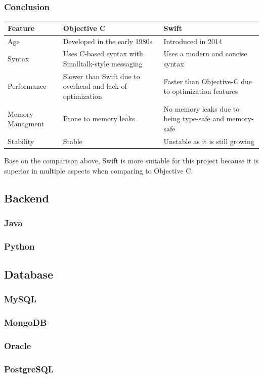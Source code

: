 \subsubsection{Conclusion}

\begin{table}[H]
    \centering
    \begin{tabular}{| >{\centering\arraybackslash}m{2cm} | >{\centering\arraybackslash}m{6cm} | >{\centering\arraybackslash}m{6cm} |}
        \hline
        \textbf{Feature} & \textbf{Objective C} & \textbf{Swift} \\ \hline
        Age & Developed in the early 1980s & Introduced in 2014 \\ \hline
        Syntax & Uses C-based syntax with Smalltalk-style messaging & Uses a modern and concise syntax \\ \hline
        Performance & Slower than Swift due to overhead and lack of optimization & Faster than Objective-C due to optimization features \\ \hline
        Memory Managment & Prone to memory leaks & No memory leaks due to being type-safe and memory-safe \\ \hline
        Stability & Stable & Unstable as it is still growing \\ \hline
    \end{tabular}
\end{table}

Base on the comparison above, Swift is more suitable for this project because it is superior in multiple aspects when comparing to Objective C.

\subsection{Backend}

\subsubsection{Java}



\subsubsection{Python}



\subsection{Database}

\subsubsection{MySQL}



\subsubsection{MongoDB}



\subsubsection{Oracle}



\subsubsection{PostgreSQL}

